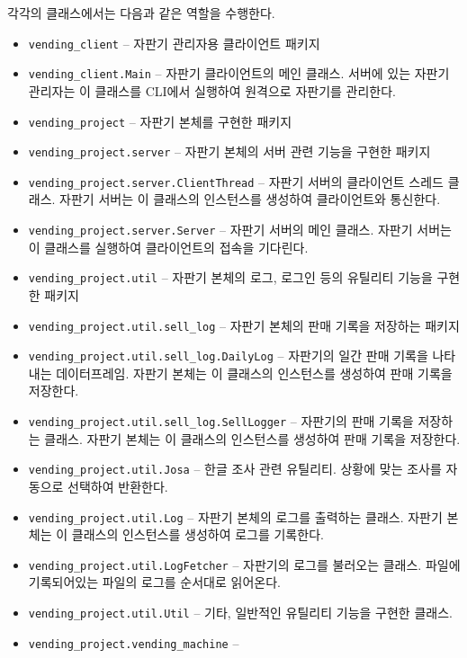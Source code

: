 \documentclass{oblivoir}
\begin{document}
    각각의 클래스에서는 다음과 같은 역할을 수행한다.
    \begin{itemize}
        \item \texttt{vending\_client} -- 자판기 관리자용 클라이언트 패키지
        \item \texttt{vending\_client.Main} --
        자판기 클라이언트의 메인 클래스. 서버에 있는 자판기 관리자는 이 클래스를 CLI에서 실행하여 원격으로 자판기를 관리한다.
        \item \texttt{vending\_project} -- 자판기 본체를 구현한 패키지
        \item \texttt{vending\_project.server} -- 자판기 본체의 서버 관련 기능을 구현한 패키지
        \item \texttt{vending\_project.server.ClientThread} --
        자판기 서버의 클라이언트 스레드 클래스. 자판기 서버는 이 클래스의 인스턴스를 생성하여 클라이언트와 통신한다.
        \item \texttt{vending\_project.server.Server} --
        자판기 서버의 메인 클래스. 자판기 서버는 이 클래스를 실행하여 클라이언트의 접속을 기다린다.
        \item \texttt{vending\_project.util} -- 자판기 본체의 로그, 로그인 등의 유틸리티 기능을 구현한 패키지
        \item \texttt{vending\_project.util.sell\_log} -- 자판기 본체의 판매 기록을 저장하는 패키지
        \item \texttt{vending\_project.util.sell\_log.DailyLog} --
        자판기의 일간 판매 기록을 나타내는 데이터프레임. 자판기 본체는 이 클래스의 인스턴스를 생성하여 판매 기록을 저장한다.
        \item \texttt{vending\_project.util.sell\_log.SellLogger} --
        자판기의 판매 기록을 저장하는 클래스. 자판기 본체는 이 클래스의 인스턴스를 생성하여 판매 기록을 저장한다.
        \item \texttt{vending\_project.util.Josa} --
        한글 조사 관련 유틸리티. 상황에 맞는 조사를 자동으로 선택하여 반환한다.
        \item \texttt{vending\_project.util.Log} --
        자판기 본체의 로그를 출력하는 클래스. 자판기 본체는 이 클래스의 인스턴스를 생성하여 로그를 기록한다.
        \item \texttt{vending\_project.util.LogFetcher} --
        자판기의 로그를 불러오는 클래스. 파일에 기록되어있는 파일의 로그를 순서대로 읽어온다.
        \item \texttt{vending\_project.util.Util} --
        기타, 일반적인 유틸리티 기능을 구현한 클래스.
        \item \texttt{vending\_project.vending\_machine} --

\end{itemize}
\end{document}
